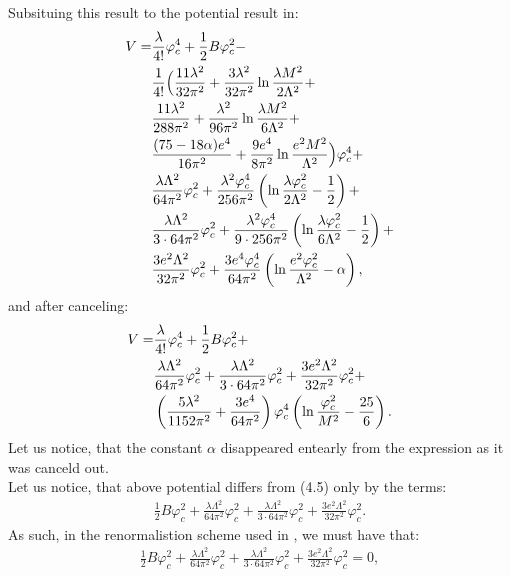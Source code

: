 Subsituing this result to the potential result in:
\begin{align}
V=&\frac{\lambda}{4!}\varphi_c^4+\frac{1}{2}B\varphi_c^2- \notag \\
&\frac{1}{4!}\Big(
\frac{11\lambda^2}{32\pi^2}+\frac{3\lambda^2}{32\pi^2}\ln\frac{\lambda M^2}{2\Lambda^2}+\notag \\
&\frac{11\lambda^2}{288\pi^2}+\frac{\lambda^2}{96\pi^2}\ln\frac{\lambda M^2}{6\Lambda^2}+\notag \\
&\frac{(75-18\alpha)e^4}{16\pi^2}+\frac{9e^4}{8\pi^2}\ln\frac{e^2M^2}{\Lambda^2}
\Big)\varphi_c^4+ \notag \\
&\frac{\lambda\Lambda^2}{64\pi^2}\varphi_c^2+\frac{\lambda^2\varphi_c^4}{256\pi^2}
\left(\ln\frac{\lambda\varphi_c^2}{2\Lambda^2}-\frac{1}{2}\right) + \notag \\
&\frac{\lambda\Lambda^2}{3\cdot 64\pi^2}\varphi_c^2+\frac{\lambda^2\varphi_c^4}{9\cdot 256\pi^2}
\left(\ln\frac{\lambda\varphi_c^2}{6\Lambda^2}-\frac{1}{2}\right) + \notag \\
&\frac{3e^2\Lambda^2}{32\pi^2}\varphi_c^2+\frac{3e^4\varphi_c^4}{64\pi^2}
\left(\ln\frac{e^2\varphi_c^2}{\Lambda^2}-\alpha\right),
\end{align}
and after canceling:
\begin{align}
V = &\frac{\lambda}{4!}\varphi_c^4+\frac{1}{2}B\varphi_c^2 + \notag \\
&\frac{\lambda\Lambda^2}{64\pi^2}\varphi_c^2+ 
\frac{\lambda\Lambda^2}{3\cdot 64\pi^2}\varphi_c^2+
\frac{3e^2\Lambda^2}{32\pi^2}\varphi_c^2 + \notag \\
&\left(\frac{5\lambda^2}{1152\pi^2}+\frac{3e^4}{64\pi^2}\right)\varphi_c^4
\left(\ln\frac{\varphi_c^2}{M^2}-\frac{25}{6}\right).
\end{align}
Let us notice, that the constant $\alpha$ disappeared entearly from the expression as it was 
canceld out. \\
Let us notice, that above potential differs from \cite{Coleman1973}(4.5) only by the terms:
\begin{align}
\frac{1}{2}B\varphi_c^2 + 
\frac{\lambda\Lambda^2}{64\pi^2}\varphi_c^2+ 
\frac{\lambda\Lambda^2}{3\cdot 64\pi^2}\varphi_c^2+
\frac{3e^2\Lambda^2}{32\pi^2}\varphi_c^2. 
\end{align}
As such, in the renormalistion scheme used in \cite{Coleman1973}, we must have that:
\begin{align}
\frac{1}{2}B\varphi_c^2 + 
\frac{\lambda\Lambda^2}{64\pi^2}\varphi_c^2+ 
\frac{\lambda\Lambda^2}{3\cdot 64\pi^2}\varphi_c^2+
\frac{3e^2\Lambda^2}{32\pi^2}\varphi_c^2 = 0, 
\end{align}
